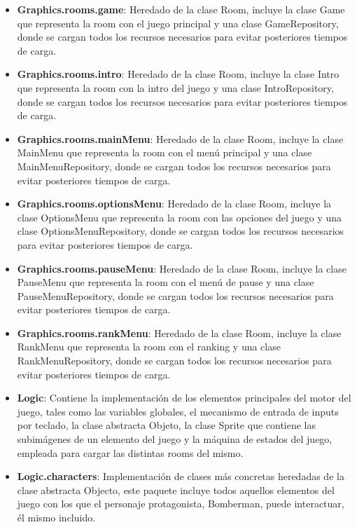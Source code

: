 \documentclass[a4paper]{article}
\begin{document}
\begin{itemize}
	\item \textbf{Graphics.rooms.game}: Heredado de la clase Room, incluye la clase Game que representa la room con el juego principal y una clase  GameRepository, donde se cargan todos los recursos necesarios para evitar posteriores tiempos de carga.
	
	\item \textbf{Graphics.rooms.intro}: Heredado de la clase Room, incluye la clase Intro que representa la room con la intro del juego y una clase  IntroRepository, donde se cargan todos los recursos necesarios para evitar posteriores tiempos de carga.
	
	\item \textbf{Graphics.rooms.mainMenu}: Heredado de la clase Room, incluye la clase MainMenu que representa la room con el menú principal y una clase  MainMenuRepository, donde se cargan todos los recursos necesarios para evitar posteriores tiempos de carga.
	
	\item \textbf{Graphics.rooms.optionsMenu}: Heredado de la clase Room, incluye la clase OptionsMenu que representa la room con las opciones del juego y una clase  OptionsMenuRepository, donde se cargan todos los recursos necesarios para evitar posteriores tiempos de carga.
	
	\item \textbf{Graphics.rooms.pauseMenu}: Heredado de la clase Room, incluye la clase PauseMenu que representa la room con el menú de pause y una clase  PauseMenuRepository, donde se cargan todos los recursos necesarios para evitar posteriores tiempos de carga.
	
	\item \textbf{Graphics.rooms.rankMenu}: Heredado de la clase Room, incluye la clase RankMenu que representa la room con el ranking y una clase  RankMenuRepository, donde se cargan todos los recursos necesarios para evitar posteriores tiempos de carga.
	
	\item \textbf{Logic}: Contiene la implementación de los elementos principales del motor del juego, tales como las variables globales, el mecanismo de entrada de inputs por teclado, la clase abstracta Objeto, la clase Sprite que contiene las subimágenes de un elemento del juego y la máquina de estados del juego, empleada para cargar las distintas rooms del mismo.
	
	\item \textbf{Logic.characters}: Implementación de clases más concretas heredadas de la clase abstracta Objecto, este paquete incluye todos aquellos elementos del juego con los que el personaje protagonista, Bomberman, puede interactuar, él mismo incluido.
	

\end{itemize}
\end{document}
